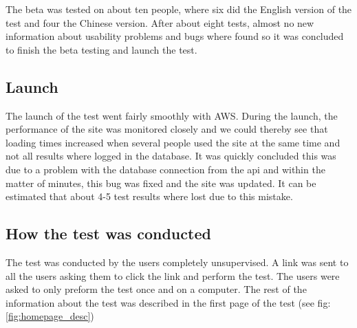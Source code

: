 The beta was tested on about ten people, where six did the English version of the test and four the Chinese version. After about eight tests, almost no new information about usability problems and bugs where found so it was concluded to finish the beta testing and launch the test.

\subsection{Launch}
The launch of the test went fairly smoothly with AWS. During the launch, the performance of the site was monitored closely and we could thereby see that loading times increased when several people used the site at the same time and not all results where logged in the database. It was quickly concluded this was due to a problem with the database connection from the api and within the matter of minutes, this bug was fixed and the site was updated. It can be estimated that about 4-5 test results where lost due to this mistake.

\subsection{How the test was conducted}
The test was conducted by the users completely unsupervised. A link was sent to all the users asking them to click the link and perform the test. The users were asked to only preform the test once and on a computer. The rest of the information about the test was described in the first page of the test (see fig: \ref{fig:homepage_desc})

 




